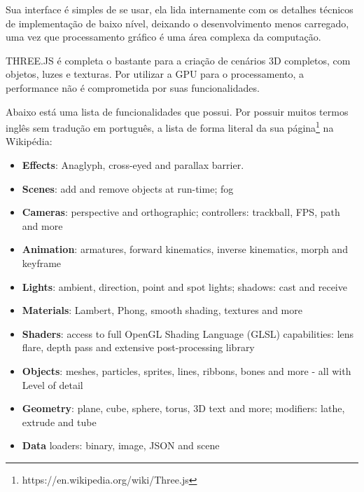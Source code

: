 \documentclass[a4paper,12pt]{article}
\begin{document}
Sua interface é simples de se usar, ela lida internamente com os detalhes técnicos de implementação de baixo nível, deixando o desenvolvimento menos carregado, uma vez que processamento gráfico é uma área complexa da computação.

THREE.JS é completa o bastante para a criação de cenários 3D completos, com objetos, luzes e texturas. Por utilizar a GPU para o processamento, a performance não é comprometida por suas funcionalidades.

Abaixo está uma lista de funcionalidades que possui. Por possuir muitos termos inglês sem tradução em português, a lista de forma literal da sua página\footnote{https://en.wikipedia.org/wiki/Three.js} na Wikipédia:

\begin{itemize}

  \item \textbf{Effects}: Anaglyph, cross-eyed and parallax barrier.

  \item \textbf{Scenes}: add and remove objects at run-time; fog

  \item \textbf{Cameras}: perspective and orthographic; controllers: trackball, FPS, path and more

  \item \textbf{Animation}: armatures, forward kinematics, inverse kinematics, morph and keyframe

  \item \textbf{Lights}: ambient, direction, point and spot lights; shadows: cast and receive

  \item \textbf{Materials}: Lambert, Phong, smooth shading, textures and more

  \item \textbf{Shaders}: access to full OpenGL Shading Language (GLSL) capabilities: lens flare, depth pass and extensive post-processing library

  \item \textbf{Objects}: meshes, particles, sprites, lines, ribbons, bones and more - all with Level of detail

  \item \textbf{Geometry}: plane, cube, sphere, torus, 3D text and more; modifiers: lathe, extrude and tube

  \item \textbf{Data} loaders: binary, image, JSON and scene


\end{itemize}
\end{document}
